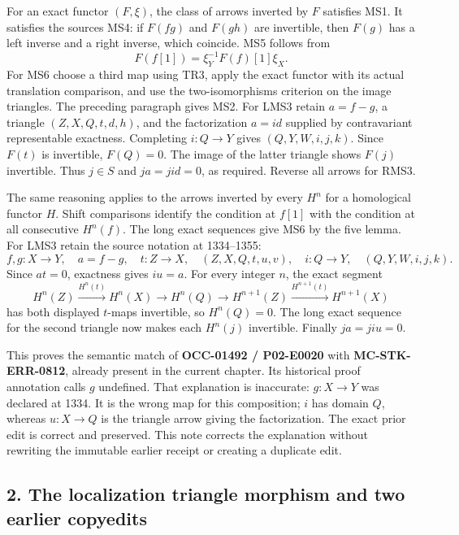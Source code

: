 For an exact functor \((F,\xi)\),\allowbreak{} the class of arrows inverted by \(F\) satisfies MS1. It satisfies the source\textquotesingle s MS4:\allowbreak{} if \(F(fg)\) and \(F(gh)\) are invertible,\allowbreak{} then \(F(g)\) has a left inverse and a right inverse,\allowbreak{} which coincide. MS5 follows from \[
F(f[1])=\xi_Y^{-1}F(f)[1]\xi_X.
\] For MS6 choose a third map using TR3,\allowbreak{} apply the exact functor with its actual translation comparison,\allowbreak{} and use the two-isomorphisms criterion on the image triangles. The preceding paragraph gives MS2. For LMS3 retain \(a=f-g\),\allowbreak{} a triangle \((Z,X,Q,t,d,h)\),\allowbreak{} and the factorization \(a=id\) supplied by contravariant representable exactness. Completing \(i:Q\to Y\) gives \((Q,Y,W,i,j,k)\). Since \(F(t)\) is invertible,\allowbreak{} \(F(Q)=0\). The image of the latter triangle shows \(F(j)\) invertible. Thus \(j\in S\) and \(ja=jid=0\),\allowbreak{} as required. Reverse all arrows for RMS3.

The same reasoning applies to the arrows inverted by every \(H^n\) for a homological functor \(H\). Shift comparisons identify the condition at \(f[1]\) with the condition at all consecutive \(H^n(f)\). The long exact sequences give MS6 by the five lemma. For LMS3 retain the source notation at 1334–\allowbreak{}1355:\allowbreak{} \[
f,g:X\to Y,\quad a=f-g,\quad t:Z\to X,\quad
(Z,X,Q,t,u,v),\quad i:Q\to Y,\quad (Q,Y,W,i,j,k).
\] Since \(at=0\),\allowbreak{} exactness gives \textbf{\(iu=a\)}. For every integer \(n\),\allowbreak{} the exact segment \[
H^n(Z)\xrightarrow{H^n(t)}H^n(X)\longrightarrow H^n(Q)
\longrightarrow H^{n+1}(Z)\xrightarrow{H^{n+1}(t)}H^{n+1}(X)
\] has both displayed \(t\)-maps invertible,\allowbreak{} so \(H^n(Q)=0\). The long exact sequence for the second triangle now makes each \(H^n(j)\) invertible. Finally \(ja=jiu=0\).

This proves the semantic match of \textbf{OCC-01492 /\allowbreak{} P02-E0020} with \textbf{MC-STK-ERR-0812},\allowbreak{} already present in the current chapter. Its historical proof annotation calls \(g\) undefined. That explanation is inaccurate:\allowbreak{} \(g:X\to Y\) was declared at 1334. It is the wrong map for this composition; \(i\) has domain \(Q\),\allowbreak{} whereas \(u:X\to Q\) is the triangle arrow giving the factorization. The exact prior edit is correct and preserved. This note corrects the explanation without rewriting the immutable earlier receipt or creating a duplicate edit.

\subsection{2. The localization triangle morphism and two earlier copyedits}\label{proofs-1149-1843-the-localization-triangle-morphism-and-two-earlier-copyedits}

